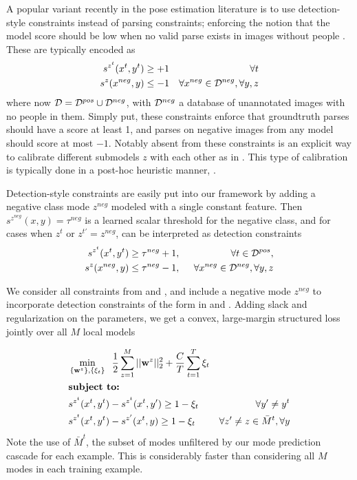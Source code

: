  A popular variant recently in the pose 
estimation literature is to use detection-style constraints instead of parsing 
constraints; enforcing the notion that the model score should be low when no 
valid parse exists in images without people 
\citep{deva2011,batra2012,tianexploring}.  These are typically encoded as
\begin{align}
s^{z^t}(x^t, y^t) &\geq +1 &\forall t \\
s^{z}(x^{neg}, y) &\leq -1 &\forall x^{neg} \in \mathcal{D}^{neg}, \forall y,z
\end{align}
where now $\mathcal{D} = \mathcal{D}^{pos} \cup \mathcal{D}^{neg}$, with $\mathcal{D}^{neg}$ a database of unannotated images with no people in them.  
Simply put, these constraints enforce that groundtruth parses should have a 
score at least 1, and parses on negative images from any model should score at 
most $-1$.  Notably absent from these constraints is an explicit way to calibrate 
different submodels $z$ with each other as in .  This type of 
calibration is typically done in a post-hoc heuristic manner, \eg 
\citep{everingham2011,esvm}.  

Detection-style constraints are easily put into our framework by adding a 
negative class mode $z^{neg}$ modeled with a single constant feature.  Then 
$s^{z^{neg}}(x,y) = \tau^{neg}$ is a learned scalar threshold for the negative 
class, and for cases when $z^t$ or $z^{t'} = z^{neg}$,  can be interpreted as
detection constraints
\begin{align}
s^{z^t}(x^t,y^t) &\geq \tau^{neg}+1,\;\; &\forall t \in \mathcal{D}^{pos}, \label{eq:cneg1} \\
s^{z}(x^{neg},y) &\leq \tau^{neg}-1,\;\; &\forall x^{neg} \in \mathcal{D}^{neg}, \label{eq:cneg2}
\forall y,z
\end{align}

We consider all constraints from  and , and include a 
negative mode $z^{neg}$ to incorporate detection constraints of the form in 
 and .  Adding slack and regularization on the parameters, we get a 
convex, large-margin structured loss jointly over all $M$ local models

\begin{align}\label{eq:full-learn}
&\min_{\{\mathbf{w}^z\}, \{\xi_{t}\}} \;\; \frac{1}{2} \sum_{z=1}^M ||\mathbf{w}^z||_2^2 + 
\frac{C}{T} \sum_{t=1}^T \xi_t \\
&\text{\bf{subject to:} } \\
&s^{z^t}(x^t,y^t) - s^{z^t}(x^t,y') \geq 1 - \xi_t\;\; &\forall y' \neq y^t \\
&s^{z^t}(x^t,y^t) - s^{z'}(x^t,y)  \geq 1 - \xi_t\;\; &\forall z' \neq z \in 
\bar{M}^t, \forall y \end{align}
Note the use of $\bar{M}^t$, the subset of modes unfiltered by our mode 
prediction cascade for each example.  This is considerably faster than 
considering all $M$ modes in each training example. 

